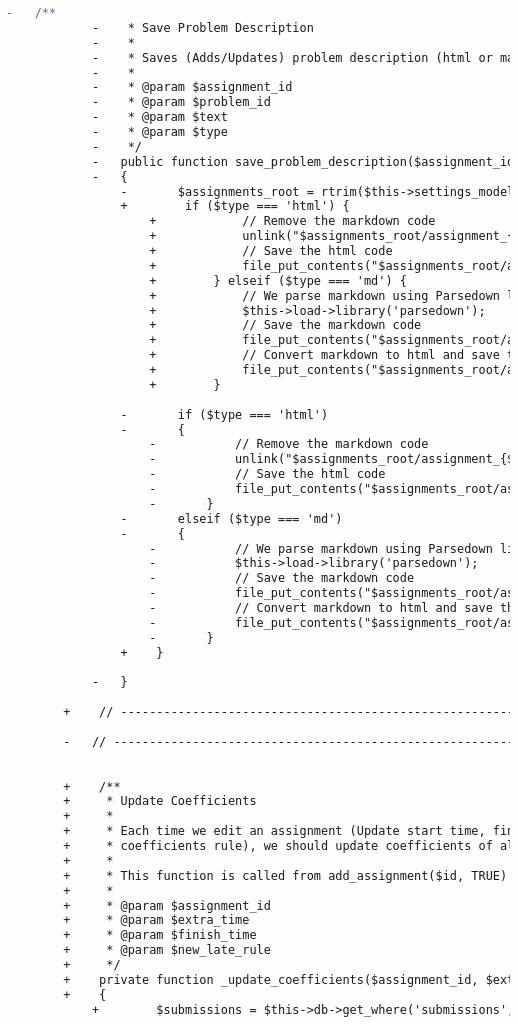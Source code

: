 \begin{lstlisting}[language=diff, caption=Perubahan pada kode Assignment\_model.php]
			-	/**
			-	 * Save Problem Description
			-	 *
			-	 * Saves (Adds/Updates) problem description (html or markdown)
			-	 *
			-	 * @param $assignment_id
			-	 * @param $problem_id
			-	 * @param $text
			-	 * @param $type
			-	 */
			-	public function save_problem_description($assignment_id, $problem_id, $text, $type)
			-	{
				-		$assignments_root = rtrim($this->settings_model->get_setting('assignments_root'), '/');
				+        if ($type === 'html') {
					+            // Remove the markdown code
					+            unlink("$assignments_root/assignment_{$assignment_id}/p{$problem_id}/desc.md");
					+            // Save the html code
					+            file_put_contents("$assignments_root/assignment_{$assignment_id}/p{$problem_id}/desc.html", $text);
					+        } elseif ($type === 'md') {
					+            // We parse markdown using Parsedown library
					+            $this->load->library('parsedown');
					+            // Save the markdown code
					+            file_put_contents("$assignments_root/assignment_{$assignment_id}/p{$problem_id}/desc.md", $text);
					+            // Convert markdown to html and save the html
					+            file_put_contents("$assignments_root/assignment_{$assignment_id}/p{$problem_id}/desc.html", $this->parsedown->parse($text));
					+        }
				
				-		if ($type === 'html')
				-		{
					-			// Remove the markdown code
					-			unlink("$assignments_root/assignment_{$assignment_id}/p{$problem_id}/desc.md");
					-			// Save the html code
					-			file_put_contents("$assignments_root/assignment_{$assignment_id}/p{$problem_id}/desc.html", $text);
					-		}
				-		elseif ($type === 'md')
				-		{
					-			// We parse markdown using Parsedown library
					-			$this->load->library('parsedown');
					-			// Save the markdown code
					-			file_put_contents("$assignments_root/assignment_{$assignment_id}/p{$problem_id}/desc.md", $text);
					-			// Convert markdown to html and save the html
					-			file_put_contents("$assignments_root/assignment_{$assignment_id}/p{$problem_id}/desc.html", $this->parsedown->parse($text));
					-		}
				+    }
			
			-	}
		
		+    // ------------------------------------------------------------------------
		
		-	// ------------------------------------------------------------------------
		
		
		+    /**
		+     * Update Coefficients
		+     *
		+     * Each time we edit an assignment (Update start time, finish time, extra time, or
		+     * coefficients rule), we should update coefficients of all submissions of that assignment
		+     *
		+     * This function is called from add_assignment($id, TRUE)
		+     *
		+     * @param $assignment_id
		+     * @param $extra_time
		+     * @param $finish_time
		+     * @param $new_late_rule
		+     */
		+    private function _update_coefficients($assignment_id, $extra_time, $finish_time, $new_late_rule)
		+    {
			+        $submissions = $this->db->get_where('submissions', array('assignment' => $assignment_id))->result_array();
			

\end{lstlisting}
